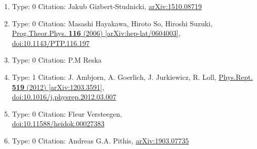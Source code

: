 \documentclass[a4paper,10pt]{article}
\begin{document}
\begin{enumerate}
\begin{enumerate}
  \item Type: 0 Citation: Jakub Gizbert-Studnicki, \href{https://arxiv.org/abs/1510.08719}{arXiv:1510.08719}
  \item Type: 0 Citation: Masashi Hayakawa, Hiroto So, Hiroshi Suzuki, \href{https://www.doi.org/10.1143/PTP.116.197}{Prog.Theor.Phys. {\bf 116} (2006) }  \href{https://arxiv.org/abs/hep-lat/0604003}{[arXiv:hep-lat/0604003]},\\\href{https://www.doi.org/10.1143/PTP.116.197}{doi:10.1143/PTP.116.197}
  \item Type: 0 Citation: P.M Reska
  \item Type: 1 Citation: J. Ambjorn, A. Goerlich, J. Jurkiewicz, R. Loll, \href{https://www.doi.org/10.1016/j.physrep.2012.03.007}{Phys.Rept. {\bf 519} (2012) }  \href{https://arxiv.org/abs/1203.3591}{[arXiv:1203.3591]},\\\href{https://www.doi.org/10.1016/j.physrep.2012.03.007}{doi:10.1016/j.physrep.2012.03.007}
  \item Type: 0 Citation: Fleur Versteegen,\\\href{https://www.doi.org/10.11588/heidok.00027383}{doi:10.11588/heidok.00027383}
  \item Type: 0 Citation: Andreas G.A. Pithis, \href{https://arxiv.org/abs/1903.07735}{arXiv:1903.07735}

\end{enumerate}
\end{enumerate}
\end{document}
